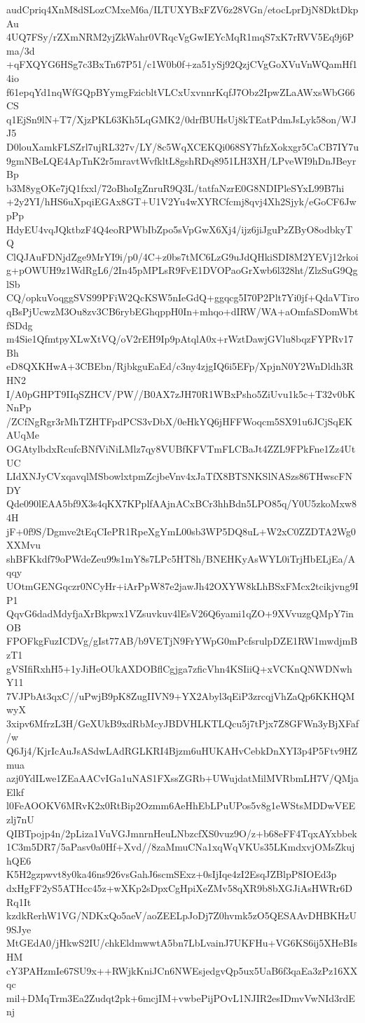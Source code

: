 audCpriq4XnM8dSLozCMxeM6a/ILTUXYBxFZV6z28VGn/etocLprDjN8DktDkpAu
4UQ7FSy/rZXmNRM2yjZkWahr0VRqcVgGwIEYcMqR1mqS7xK7rRVV5Eq9j6Pma/3d
+qFXQYG6HSg7c3BxTn67P51/c1W0b0f+za51ySj92QzjCVgGoXVuVnWQamHf14io
f61epqYd1nqWfGQpBYymgFzicbltVLCxUxvnnrKqfJ7Obz2IpwZLaAWxsWbG66CS
q1EjSn9lN+T7/XjzPKL63Kh5LqGMK2/0drfBUHsUj8kTEatPdmJsLyk58on/WJJ5
D0louXamkFLSZrl7ujRL327v/LY/8c5WqXCEKQi068SY7hfzXokxgr5CaCB7IY7u
9gmNBeLQE4ApTnK2r5mravtWvfkltL8gshRDq8951LH3XH/LPveWI9hDnJBeyrBp
b3M8ygOKe7jQ1fxxl/72oBhoIgZnruR9Q3L/tatfaNzrE0G8NDIPleSYxL99B7hi
+2y2YI/hHS6uXpqiEGAx8GT+U1V2Yu4wXYRCfcmj8qvj4Xh2Sjyk/eGoCF6JwpPp
HdyEU4vqJQktbzF4Q4eoRPWbIbZpo5sVpGwX6Xj4/ijz6jiJguPzZByO8odbkyTQ
ClQJAuFDNjdZge9MrYI9i/p0/4C+z0bs7tMC6LzG9uJdQHkiSDI8M2YEVj12rkoi
g+pOWUH9z1WdRgL6/2In45pMPLsR9FvE1DVOPaoGrXwb6l328ht/ZlzSuG9QglSb
CQ/opkuVoqggSVS99PFiW2QcKSW5nIeGdQ+ggqcg5I70P2Plt7Yi0jf+QdaVTiro
qBsPjUcwzM3Ou8zv3CB6rybEGhqppH0In+mhqo+dIRW/WA+aOmfaSDomWbtfSDdg
m4Sie1QfmtpyXLwXtVQ/oV2rEH9Ip9pAtqlA0x+rWztDawjGVlu8bqzFYPRv17Bh
eD8QXKHwA+3CBEbn/RjbkguEaEd/c3ny4zjgIQ6i5EFp/XpjnN0Y2WnDldh3RHN2
I/A0pGHPT9IIqSZHCV/PW//B0AX7zJH70R1WBxPsho5ZiUvu1k5c+T32v0bKNnPp
/ZCfNgRgr3rMhTZHTFpdPCS3vDbX/0eHkYQ6jHFFWoqcm5SX91u6JCjSqEKAUqMe
OGAtylbdxRcufcBNfViNiLMlz7qy8VUBfKFVTmFLCBaJt4ZZL9FPkFne1Zz4UtUC
LIdXNJyCVxqavqlMSbowlxtpmZcjbeVnv4xJaTfX8BTSNKSlNASzs86THwscFNDY
Qde090lEAA5bf9X3s4qKX7KPplfAAjnACxBCr3hhBdn5LPO85q/Y0U5zkoMxw84H
jF+0f9S/Dgmve2tEqCIePR1RpeXgYmL00sb3WP5DQ8uL+W2xC0ZZDTA2Wg0XXMvu
shBFKkdf79oPWdeZeu99s1mY8s7LPc5HT8h/BNEHKyAsWYL0iTrjHbELjEa/Aqqy
UOtmGENGqczr0NCyHr+iArPpW87e2jawJh42OXYW8kLhBSxFMcx2tcikjvng9IP1
QqvG6dadMdyfjaXrBkpwx1VZsuvkuv4lEsV26Q6yami1qZO+9XVvuzgQMpY7inOB
FPOFkgFuzICDVg/gIst77AB/b9VETjN9FrYWpG0mPcfsrulpDZE1RW1mwdjmBzT1
gVSIfiRxhH5+1yJiHeOUkAXDOBflCgjga7zficVhn4KSIiiQ+xVCKnQNWDNwhY11
7VJPbAt3qxC//uPwjB9pK8ZugIIVN9+YX2Abyl3qEiP3zrcqjVhZaQp6KKHQMwyX
3xipv6MfrzL3H/GeXUkB9xdRbMcyJBDVHLKTLQcu5j7tPjx7Z8GFWn3yBjXFaf/w
Q6Jj4/KjrIcAuJsASdwLAdRGLKRI4Bjzm6uHUKAHvCebkDnXYI3p4P5Ftv9HZmua
azj0YdILwe1ZEaAACvIGa1uNAS1FXssZGRb+UWujdatMilMVRbmLH7V/QMjaElkf
l0FeAOOKV6MRvK2x0RtBip2Ozmm6AeHhEbLPuUPos5v8g1eWStsMDDwVEEzlj7nU
QIBTpojp4n/2pLiza1VuVGJmnrnHeuLNbzcfXS0vuz9O/z+b68eFF4TqxAYxbbek
1C3m5DR7/5aPasv0a0Hf+Xvd//8zaMmuCNa1xqWqVKUs35LKmdxvjOMsZkujhQE6
K5H2gzpwvt8y0ka46ns926vsGahJ6scmSExz+0sIjIqe4zI2EsqJZBlpP8IOEd3p
dxHgFF2yS5ATHcc45z+wXKp2sDpxCgHpiXeZMv58qXR9b8bXGJiAsHWRr6DRq1It
kzdkRerhW1VG/NDKxQo5aeV/aoZEELpJoDj7Z0hvmk5zO5QESAAvDHBKHzU9SJye
MtGEdA0/jHkwS2IU/chkEldmwwtA5bn7LbLvainJ7UKFHu+VG6KS6ij5XHeBIsHM
cY3PAHzmIe67SU9x++RWjkKniJCn6NWEsjedgvQp5ux5UaB6f3qaEa3zPz16XXqc
mil+DMqTrm3Ea2Zudqt2pk+6mcjIM+vwbePijPOvL1NJIR2esIDmvVwNId3rdEnj
